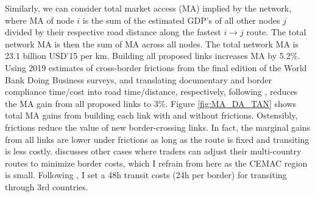 \documentclass[a4paper]{article}
\begin{document}
Similarly, we can consider total market access (MA) implied by the network, where MA of node $i$ is the sum of the estimated GDP's of all other nodes $j$ divided by their respective road distance along the fastest $i\to j$ route. The total network MA is then the sum of MA across all nodes. The total network MA is 23.1 billion USD'15 per km. Building all proposed links increases MA by 5.2\%. Using 2019 estimates of cross-border frictions from the final edition of the World Bank Doing Business surveys, and translating documentary and border compliance time/cost into road time/distance, respectively, following \citet{krantz2024optimal}, reduces the MA gain from all proposed links to 3\%. Figure \ref{fig:MA_DA_TAN} shows total MA gains from building each link with and without frictions. Ostensibly, frictions reduce the value of new border-crossing links. In fact, the marginal gains from all links are lower under frictions as long as the route is fixed and transiting is less costly.  \citet{krantz2024optimal} discusses other cases where traders can adjust their multi-country routes to minimize border costs, which I refrain from here as the CEMAC region is small. Following \citet{krantz2024optimal}, I set a 48h transit costs (24h per border) for transiting through 3rd countries. %
\end{document}
